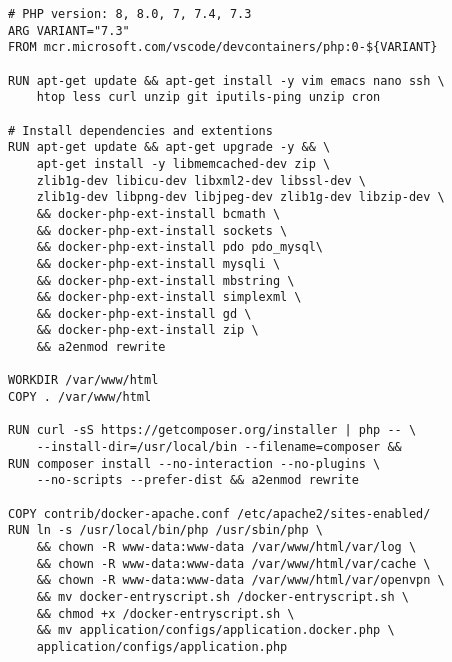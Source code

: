 
\begin{lstlisting}[language=docker, frame=single, caption={PHP DevContainer Dockerfile},label=code::docker_dev_php]
# PHP version: 8, 8.0, 7, 7.4, 7.3
ARG VARIANT="7.3"
FROM mcr.microsoft.com/vscode/devcontainers/php:0-${VARIANT}

RUN apt-get update && apt-get install -y vim emacs nano ssh \
    htop less curl unzip git iputils-ping unzip cron

# Install dependencies and extentions
RUN apt-get update && apt-get upgrade -y && \
    apt-get install -y libmemcached-dev zip \
    zlib1g-dev libicu-dev libxml2-dev libssl-dev \
    zlib1g-dev libpng-dev libjpeg-dev zlib1g-dev libzip-dev \
    && docker-php-ext-install bcmath \
    && docker-php-ext-install sockets \
    && docker-php-ext-install pdo pdo_mysql\
    && docker-php-ext-install mysqli \
    && docker-php-ext-install mbstring \
    && docker-php-ext-install simplexml \
    && docker-php-ext-install gd \
    && docker-php-ext-install zip \
    && a2enmod rewrite

WORKDIR /var/www/html
COPY . /var/www/html

RUN curl -sS https://getcomposer.org/installer | php -- \
    --install-dir=/usr/local/bin --filename=composer &&
RUN composer install --no-interaction --no-plugins \
    --no-scripts --prefer-dist && a2enmod rewrite

COPY contrib/docker-apache.conf /etc/apache2/sites-enabled/
RUN ln -s /usr/local/bin/php /usr/sbin/php \
    && chown -R www-data:www-data /var/www/html/var/log \
    && chown -R www-data:www-data /var/www/html/var/cache \
    && chown -R www-data:www-data /var/www/html/var/openvpn \
    && mv docker-entryscript.sh /docker-entryscript.sh \
    && chmod +x /docker-entryscript.sh \
    && mv application/configs/application.docker.php \
    application/configs/application.php
\end{lstlisting}



